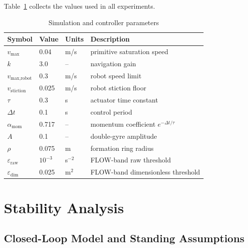 \documentclass[lettersize,journal]{IEEEtran}
\begin{document}
Table~\ref{tab:params} collects the values used in all experiments.

\begin{table}[!t]
\centering
\caption{Simulation and controller parameters}
\label{tab:params}
\footnotesize
\setlength{\tabcolsep}{4pt}
\begin{tabular}{llll}
\hline
\textbf{Symbol} & \textbf{Value} & \textbf{Units} & \textbf{Description} \\
\hline
$v_{\max}$ & 0.04 & m/s & primitive saturation speed \\
$k$ & 3.0 & -- & navigation gain \\
$v_{\text{max,robot}}$ & 0.3 & m/s & robot speed limit \\
$v_{\text{stiction}}$ & 0.025 & m/s & robot stiction floor \\
$\tau$ & 0.3 & s & actuator time constant \\
$\Delta t$ & 0.1 & s & control period \\
$\alpha_{\text{mom}}$ & 0.717 & -- & momentum coefficient $e^{-\Delta t/\tau}$ \\
$A$ & 0.1 & -- & double-gyre amplitude \\
$\rho$ & 0.075 & m & formation ring radius \\
$\varepsilon_{\text{raw}}$ & $10^{-3}$ & s$^{-2}$ & FLOW-band raw threshold \\
$\varepsilon_{\text{dim}}$ & 0.025 & m$^{2}$ & FLOW-band dimensionless threshold \\
\hline
\end{tabular}
\end{table}


\section{Stability Analysis}
\label{sec:stability}

\subsection{Closed-Loop Model and Standing Assumptions}
\end{document}
